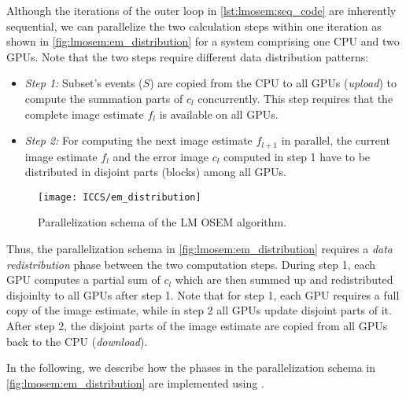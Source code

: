 Although the iterations of the outer loop in \autoref{lst:lmosem:seq_code} are inherently sequential, we can parallelize the two calculation steps within one iteration as shown in \autoref{fig:lmosem:em_distribution} for a system comprising one CPU and two GPUs.
Note that the two steps require different data distribution patterns:
\begin{itemize}
  \item[] \emph{Step 1:} Subset's events ($S$) are copied from the CPU to all GPUs (\emph{upload}) to compute the summation parts of $c_l$ concurrently. This step requires that the complete image estimate $f_l$ is available on all GPUs.
  \item[] \emph{Step 2:} For computing the next image estimate $f_{l+1}$ in parallel, the current image estimate $f_l$ and the error image $c_l$ computed in step 1 have to be distributed in disjoint parts (blocks) among all GPUs.
\end{itemize}

\begin{figure}
  \centering
  \texttt{[image: ICCS/em\_distribution]}
  \caption{Parallelization schema of the LM OSEM algorithm.}
  \label{fig:lmosem:em_distribution}
\end{figure}
Thus, the parallelization schema in \autoref{fig:lmosem:em_distribution} requires a \emph{data redistribution} phase between the two computation steps.
During step 1, each GPU computes a partial sum of $c_l$ which are then summed up and redistributed disjoinlty to all GPUs after step 1.
Note that for step 1, each GPU requires a full copy of the image estimate, while in step 2 all GPUs update disjoint parts of it.
After step 2, the disjoint parts of the image estimate are copied from all GPUs back to the CPU (\emph{download}).

\bigskip\noindent
In the following, we describe how the phases in the parallelization schema in \autoref{fig:lmosem:em_distribution} are implemented using \OpenCL.


